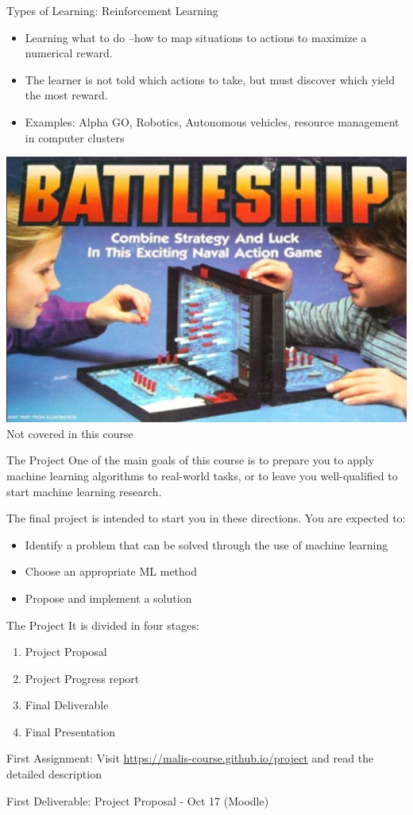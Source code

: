 \documentclass[aspectratio=169,10pt]{beamer}
\begin{document}
\begin{frame}{Types of Learning: Reinforcement Learning}
	\begin{itemize}
		\item Learning what to do –how to map situations to actions to maximize a numerical reward.
		\item The learner is not told which actions to take, but must discover which yield the most reward.
		\item \alert{Examples:} Alpha GO, Robotics, Autonomous vehicles, resource management in computer clusters
	\end{itemize}
	\centering
	\includegraphics[width=0.4\linewidth, clip]{images/reinforcement}\\
	Not covered in this course
	\end{frame}
\begin{frame}{The Project}
	One of the main goals of this course is to prepare you to apply machine learning algorithms to real-world tasks, or to leave you well-qualified to start machine learning research. 
	
	The final project is intended to start you in these directions. You are expected to:
	\begin{itemize}
		\item Identify a problem that can be solved through the use of machine learning
		\item Choose an appropriate ML method 
		\item Propose and implement a solution
	\end{itemize}
	
\end{frame}

\begin{frame}{The Project}
	It is divided in four stages:
	\begin{enumerate}
		\item Project Proposal
		\item Project Progress report
		\item Final Deliverable 
		\item Final Presentation
	\end{enumerate}
\pause
\begin{alertblock}{First Assignment:}
	Visit \url{https://malis-course.github.io/project} and read the detailed description \\
\end{alertblock}
\begin{alertblock}{First Deliverable:}
	Project Proposal - Oct 17 (Moodle)
\end{alertblock}
\end{frame}
\end{document}
